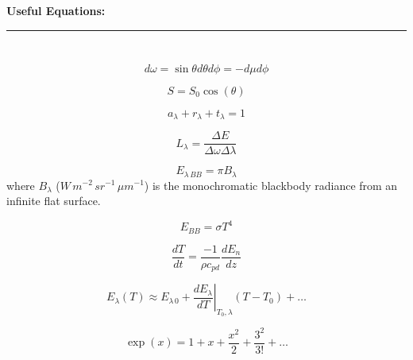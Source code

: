 \documentclass[12pt]{article}
\begin{document}
\begin{center}
  \textbf{Useful Equations:}
\end{center}



\begin{multicols}{2}


\noindent
\rule{3cm}{.1mm}

$~$

\noindent

$~$


\begin{equation}
  \label{eq:omega}
  d \omega = \sin \theta d\theta d\phi = -d\mu d\phi
\end{equation}

\begin{equation}
  \label{eq:cos}
  S = S_0 \cos(\theta)
\end{equation}

\begin{equation}
  \label{eq:conservation}
  a_\lambda + r_\lambda + t_\lambda = 1
\end{equation}

\begin{equation}
  \label{eq:intensity}
  L_\lambda = \frac{\Delta E}{\Delta \omega \Delta \lambda}
\end{equation}


\begin{equation}
  \label{eq:pi}
  E_{\lambda\,BB} = \pi B_\lambda
\end{equation}
where $B_\lambda$ ($W\,m^{-2}\,sr^{-1}\,\mu m^{-1}$) is the monochromatic blackbody radiance
from an infinite flat surface.


\begin{equation}
  \label{eq:stefan}
  E_{BB}=\sigma T^4
\end{equation}

\begin{equation}
  \label{eq:fluxdiv}
  \frac{dT}{dt} = \frac{-1}{\rho c_{pd}} \frac{dE_n}{dz}
\end{equation}


\begin{equation}
  \label{eq:taylor}
  E_\lambda(T) \approx E_{\lambda\, 0} + \left .\frac{dE_\lambda}{dT}  \right |_{T_0,\lambda} \!\!\! (T - T_0) + \ldots
\end{equation}

\begin{equation}
  \label{eq:exp}
  \exp(x) = 1 + x +  \frac{x^2}{2} + \frac{3^2}{3!} + \ldots
\end{equation}


\end{multicols}
\end{document}
